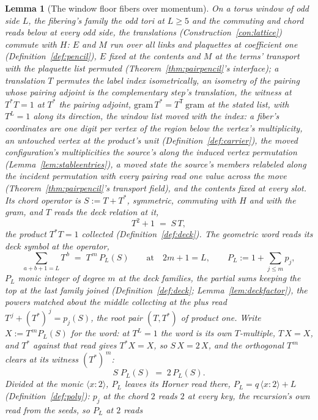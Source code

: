 \documentclass[11pt]{article}
\newtheorem{lemma}{Lemma}
\theoremstyle{definition}
\begin{document}
\begin{lemma}[The window floor fibers over momentum]\label{lem:fiberdec}
On a torus window of odd side $L$, the fibering's family the
\emph{odd tori} at $L\ge5$ and the commuting and chord reads below
at every odd side, the translations
(Construction~\ref{con:lattice}) commute with $H$: $E$ and $M$ run
over all links and plaquettes at coefficient one
(Definition~\ref{def:pencil}), $E$ fixed at the contents and $M$ at
the terms' transport with the plaquette list permuted
(Theorem~\ref{thm:pairpencil}'s interface); a translation $T$ permutes the label
index isometrically, an isometry of the pairing whose pairing
adjoint is the complementary step's translation, the witness at
$T^{*}T=1$ at $T^{*}$ the pairing adjoint,
$\mathrm{gram}\,T^{*}=T^{\mathsf T}\,\mathrm{gram}$ at the stated
list, with $T^L=1$ along its direction, the window
list moved with the index: a fiber's coordinates are one digit per
vertex of the region below the vertex's multiplicity, an untouched
vertex at the product's unit (Definition~\ref{def:carrier}), the
moved configuration's multiplicities the source's along the induced
vertex permutation (Lemma~\ref{lem:stableentries}), a moved state
the source's members relabeled along the incident permutation with
every pairing read one value across the move
(Theorem~\ref{thm:pairpencil}'s transport field), and the contents
fixed at every slot. Its \emph{chord operator} is
$S:=T+T^{*}$, symmetric, commuting with $H$ and with the
gram, and $T$ reads the deck relation at it,
\[
T^2+1\;=\;S\,T ,
\]
the product $T^{*}T=1$ collected
(Definition~\ref{def:deck}). The geometric word reads its deck symbol
at the operator,
\[
\sum_{a+b+1=L}T^{\,b}\;=\;T^{\,m}\,P_L(S)
\qquad\text{at}\quad 2m+1=L ,
\qquad P_L:=1+\sum_{j\le m}p_j ,
\]
$P_L$ monic integer of degree $m$ at the deck families, the partial
sums keeping the top at the last family joined
(Definition~\ref{def:deck}; Lemma~\ref{lem:deckfactor}), the powers
matched about the middle collecting at the plus read
$T^{\,j}+(T^{*})^{\,j}=p_j(S)$, the root pair
$(T,T^{*})$ of product one. Write $X:=T^{\,m}P_L(S)$ for the
word: at $T^L=1$ the word is its own $T$-multiple, $T\,X=X$, and
$T^{*}$ against that read gives $T^{*}X=X$, so
$S\,X=2\,X$, and the orthogonal $T^{\,m}$ clears at its witness
$(T^{*})^{\,m}$:
\[
S\;P_L(S)\;=\;2\,P_L(S) .
\]
Divided at the monic $\langle x\!:\!2\rangle$, $P_L$ leaves its Horner
read there, $P_L=q\,\langle x\!:\!2\rangle+L$
(Definition~\ref{def:poly}): $p_j$ at the chord $2$ reads $2$ at every
key, the recursion's own read from the seeds, so $P_L$ at $2$ reads

\end{lemma}
\end{document}
